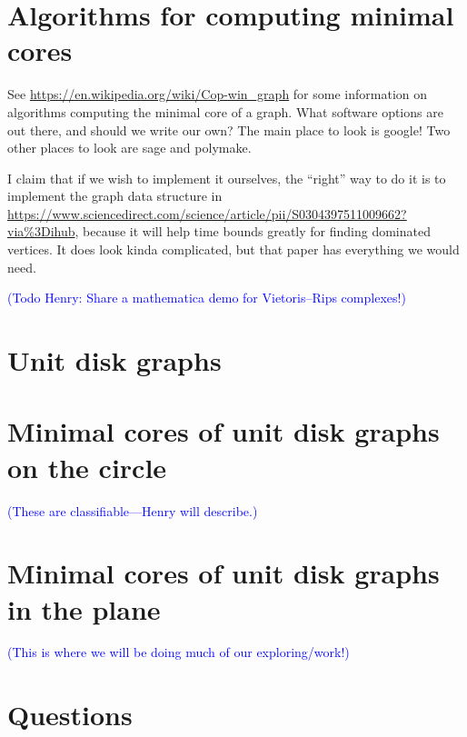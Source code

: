 \documentclass[amscd, amssymb, verbatim]{amsart}[12pt]
\newcommand{\note}[1]{\textcolor{blue}{({#1})}}
\theoremstyle{plain}
\theoremstyle{definition}
\begin{document}
\section{Algorithms for computing minimal cores}
See \url{https://en.wikipedia.org/wiki/Cop-win\_graph} for some information on algorithms computing the minimal core of a graph.
What software options are out there, and should we write our own?
The main place to look is google!
Two other places to look are sage and polymake.

I claim that if we wish to implement it ourselves, the ``right'' way to do it is to implement the graph data structure in \url{https://www.sciencedirect.com/science/article/pii/S0304397511009662?via\%3Dihub}, because it will help time bounds greatly for finding dominated vertices.  It does look kinda complicated, but that paper has everything we would need. 

\note{Todo Henry: Share a mathematica demo for Vietoris--Rips complexes!}



\section{Unit disk graphs}



\section{Minimal cores of unit disk graphs on the circle}

\note{These are classifiable---Henry will describe.}



\section{Minimal cores of unit disk graphs in the plane}

\note{This is where we will be doing much of our exploring/work!}



\section{Questions}
\end{document}
